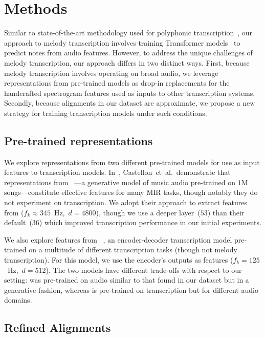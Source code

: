 \vspace{-3mm}
\section{Methods}

Similar to state-of-the-art methodology used for polyphonic transcription~\cite{hawthorne2021sequence}, 
our approach to melody transcription involves training Transformer models~\cite{vaswani2017attention} to predict notes from audio features. 
However, to address the unique challenges of melody transcription, our approach differs in two distinct ways. 
First, because melody transcription involves operating on broad audio, we leverage representations from pre-trained models as drop-in replacements for the handcrafted spectrogram features used as inputs to other transcription systems. 
Secondly, because alignments in our dataset are approximate, we propose a new strategy for training transcription models under such conditions.

\subsection{Pre-trained representations}
\label{sec:representations}

We explore representations from two different pre-trained models for use as input features to transcription models.
In~\cite{castellon2021calm}, Castellon~et~al.\ demonstrate that representations from \jukebox~\cite{dhariwal2020jukebox}---a generative model of music audio pre-trained on $1$M songs---constitute effective features for many MIR tasks, though notably they do not experiment on transcription. 
We adopt their approach to extract features from \jukebox{} (${f_k \approx 345}$~Hz,~${d = 4800}$), though we use a deeper layer~($53$) than their default~($36$) which improved transcription performance in our initial experiments. 

We also explore features from \mtthree~\cite{gardner2021mt3}, an encoder-decoder transcription model pre-trained on a multitude of different transcription tasks (though not melody transcription). 
For this model, we use the encoder's outputs as features (${f_k = 125}$~Hz,~${d = 512}$). 
The two models have different trade-offs with respect to our setting: \jukebox{} was pre-trained on audio similar to that found in our dataset but in a generative fashion, 
whereas \mtthree{} is pre-trained on transcription but for different audio domains.

\subsection{Refined Alignments}
\label{sec:align}

